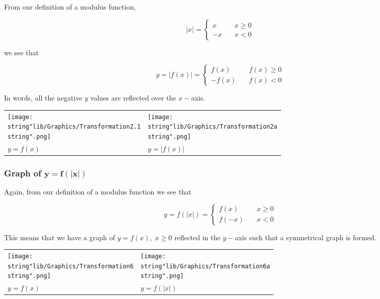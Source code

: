 \documentclass[11pt,a4paper]{book}
\begin{document}
From our definition of a modulus function,

\[
\lvert x\rvert=\left\{ \begin{array}{ll}
x & \quad x\geq0\\
-x & \quad x<0
\end{array}\right.
\]

we see that

\[
y=\left|f\left(x\right)\right|=\left\{ \begin{array}{ll}
f\left(x\right) & \quad f\left(x\right)\geq0\\
-f\left(x\right) & \quad f\left(x\right)<0
\end{array}\right.
\]

In words, all the negative $y$ values are reflected over the $x-$axis.
\begin{center}
\begin{tabular}{>{\centering}p{6.2cm}>{\centering}p{6.2cm}}
\centering{}\texttt{[image: \\string"lib/Graphics/Transformation2.1\\string".png]} & \centering{}\texttt{[image: \\string"lib/Graphics/Transformation2a\\string".png]}\tabularnewline
\centering{}$y=f\left(x\right)$ & \centering{}$y=\left|f\left(x\right)\right|$\tabularnewline
\end{tabular}
\par\end{center}

\subsubsection{Graph of $\ensuremath{\mathbf{y=f\left(\left|x\right|\right)}}$}

Again, from our definition of a modulus function we see that

\[
y=f\left(\left|x\right|\right)=\left\{ \begin{array}{ll}
f\left(x\right) & \quad x\geq0\\
f\left(-x\right) & \quad x<0
\end{array}\right.
\]

This means that we have a graph of $y=f\left(x\right),\;x\geq0$ reflected
in the $y-$axis such that a symmetrical graph is formed.
\begin{center}
\begin{tabular}{>{\centering}p{6.2cm}>{\centering}p{6.2cm}}
\centering{}\texttt{[image: \\string"lib/Graphics/Transformation6\\string".png]} & \centering{}\texttt{[image: \\string"lib/Graphics/Transformation6a\\string".png]}\tabularnewline
\centering{}$y=f\left(x\right)$ & \centering{}$y=f\left(\left|x\right|\right)$\tabularnewline
\end{tabular}
\par\end{center}
\end{document}
